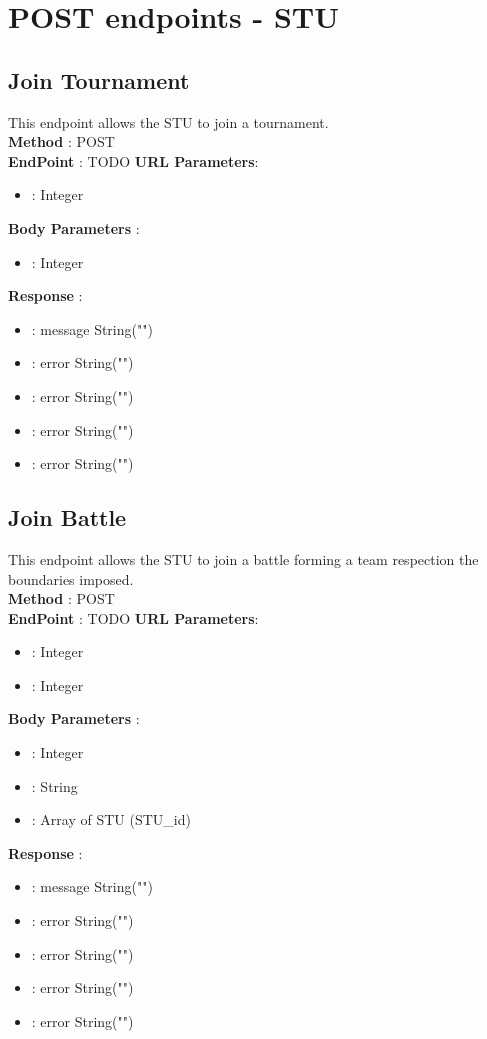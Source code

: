 \section*{POST endpoints - STU}
\subsection*{Join Tournament}
This endpoint allows the STU to join a tournament.\\
\textbf{Method} : POST \\
\textbf{EndPoint} : {\color{blue} TODO}
\textbf{URL Parameters}:
\begin{itemize}
    \item {} : Integer
\end{itemize}
\textbf{Body Parameters} :
\begin{itemize}
    \item {} : Integer   
\end{itemize}
\textbf{Response} :
\begin{itemize}
    \item {} : message String("")
    \item {} : error String("")
    \item {} : error String("")
    \item {} : error String("")
    \item {} : error String("")
\end{itemize}

\subsection*{Join Battle}
This endpoint allows the STU to join a battle forming a team respection the boundaries imposed.\\
\textbf{Method} : POST \\
\textbf{EndPoint} : {\color{blue} TODO}
\textbf{URL Parameters}:
\begin{itemize}
    \item {} : Integer
    \item {} : Integer   
\end{itemize}
\textbf{Body Parameters} :
\begin{itemize}
    \item {} : Integer  
    \item {} : String  
    \item {} : Array of STU (STU\_id)  
\end{itemize}
\textbf{Response} :
\begin{itemize}
    \item {} : message String("")
    \item {} : error String("")
    \item {} : error String("")
    \item {} : error String("")
    \item {} : error String("")
\end{itemize}

